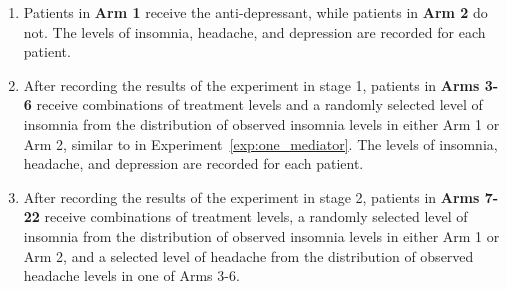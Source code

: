 \begin{experiment}\label{exp:two_mediators}
\indent 
\begin{enumerate}[noitemsep,topsep=0pt]
	\item Patients in \textbf{Arm 1} receive the anti-depressant, while patients in \textbf{Arm 2} do not. 
	The levels of insomnia, headache, and depression are recorded for each patient.
	\item After recording the results of the experiment in stage 1, patients in \textbf{Arms 3-6} 
	receive combinations of treatment levels and a randomly selected level of insomnia 
	from the distribution of observed insomnia levels in either Arm 1 or Arm 2, similar to in 
	Experiment~\ref{exp:one_mediator}. The levels of insomnia, headache, and depression are recorded 
	for each patient.
	\item After recording the results of the experiment in stage 2, patients in \textbf{Arms 7-22} 
	receive combinations of treatment levels, a randomly selected level of insomnia from the distribution of
	observed insomnia levels in either Arm 1 or Arm 2, and a selected level of headache from the 
	distribution of observed headache levels in one of Arms 3-6. 
\end{enumerate}
\end{experiment}

